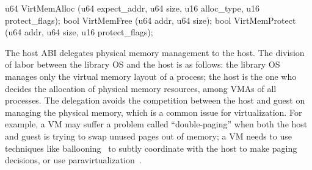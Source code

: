 \begin{paldef}
u64  VirtMemAlloc   (u64 expect_addr, u64 size,
                     u16 alloc_type, u16 protect_flags);
bool VirtMemFree    (u64 addr, u64 size);
bool VirtMemProtect (u64 addr, u64 size,
                     u16 protect_flags);
\end{paldef}


The host ABI delegates physical memory management to the host. The division of labor between the library OS and the host is as follows:
the library OS manages only the virtual memory layout of a process;
the host is the one who decides the allocation of physical memory resources, among VMAs of all processes.
The delegation avoids the competition between the host and guest
on managing the physical memory, which is a common issue for virtualization.
For example, a VM may suffer a problem called ``double-paging'' when both the host and guest is trying to swap unused pages out of memory; a VM needs to use techniques like ballooning~\cite{wldspurger02vmware-esx} to subtly coordinate with the host to make paging decisions,
or use paravirtualization~\cite{vmware_vmi}.







